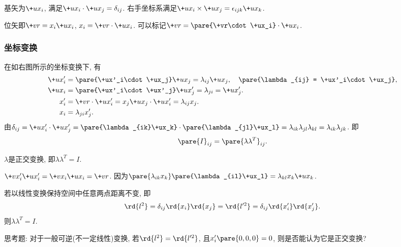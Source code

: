 \documentclass[hidelinks]{ctexart}
\begin{document}
基矢为$\+ux_i$, 满足$\+ux_i \cdot \+ux_j = \delta_{ij}$. 右手坐标系满足$\+ux_i\times\+ux_j = \epsilon_{ijk}\+ux_k$.
\par
位矢即$\+vr = x_i\+ux_i$, $x_i = \+vr \cdot \+ux_i$. 可以标记$\+vr = \pare{\+vr\cdot\+ux_i}\cdot\+ux_i$.


\subsubsection{坐标变换} %
\label{ssub:坐标变换}

\begin{figure}[ht]
    \centering
\end{figure}

在如右图所示的坐标变换下, 有
\begin{align*}
    \+ux'_i &= \pare{\+ux'_i\cdot\+ux_j}\+ux_j = \lambda_{ij}\+ux_j,\quad \pare{\lambda_{ij} = \+ux'_i\cdot\+ux_j}, \\
    \+ux_i &= \pare{\+ux'_i\cdot\+ux'_j} \+ux'_j = \lambda_{ji} = \+ux'_j. \\
    x'_i &= \+vr \cdot \+ux'_i = x_j\+ux_j\cdot\+ux'_i = \lambda_{ij}x_j. \\
    x_i &= \lambda_{ji}x'_j.
\end{align*}
由$\delta_{ij} = \+ux'_i\cdot\+ux'_j = \pare{\lambda_{ik}\+ux_k}\cdot\pare{\lambda_{jl}\+ux_l} = \lambda_{ik}\lambda_{jl}\lambda_{kl} = \lambda_{ik}\lambda_{jk}$. 即
\[ \pare{I}_{ij} = \pare{\lambda \lambda^T}_{ij}. \]
\begin{cenum}
    \item $\lambda$是正交变换, 即$\lambda \lambda^T = I$.
    \item $\+vx'_i \+ux'_i = \+vx_i \+ux_i = \+vr$. 因为$\pare{\lambda_{ik}x_k}\pare{\lambda_{il}\+ux_l} = \lambda_{kl}x_k\+ux_k$.
    \item 若以线性变换保持空间中任意两点距离不变,  即
    \[ \rd{l^2} = \delta_{ij}\rd{x_i}\rd{x_j} = \rd{l'^2} = \delta_{ij}\rd{x'_i}\rd{x'_j}. \]
    则$\lambda \lambda^T = I$.
\end{cenum}
\begin{ex}
    思考题: 对于一般可逆(不一定线性)变换, 若$\rd{l^2} = \rd{l'^2}$, 且$x'_i\pare{0,0,0} = 0$, 则是否能认为它是正交变换?
\end{ex}


\end{document}

